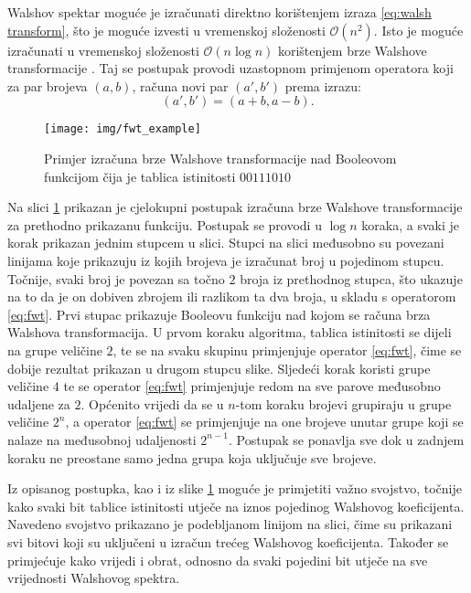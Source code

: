 Walshov spektar moguće je izračunati direktno korištenjem izraza \ref{eq:walsh transform}, što je moguće izvesti u vremenskoj složenosti $\mathcal{O}(n^2)$.
Isto je moguće izračunati u vremenskoj složenosti $\mathcal{O}(n\log n)$ korištenjem brze Walshove transformacije .
Taj se postupak provodi uzastopnom primjenom operatora koji za par brojeva $(a, b)$, računa novi par $(a', b')$ prema izrazu:
\begin{equation}\label{eq:fwt}
    (a', b') = (a+b, a-b).
\end{equation}
\begin{figure}[ht!] 
    \centering
    \texttt{[image: img/fwt\_example]}
    \captionsetup{justification=centering}
    \caption{Primjer izračuna brze Walshove transformacije nad Booleovom funkcijom čija je tablica istinitosti $00111010$}
    \label{fig:fwt_example}
\end{figure}
Na slici \ref{fig:fwt_example} prikazan je cjelokupni postupak izračuna brze Walshove transformacije za prethodno prikazanu funkciju.
Postupak se provodi u $\log n$ koraka, a svaki je korak prikazan jednim stupcem u slici.
Stupci na slici međusobno su povezani linijama koje prikazuju iz kojih brojeva je izračunat broj u pojedinom stupcu.
Točnije, svaki broj je povezan sa točno $2$ broja iz prethodnog stupca, što ukazuje na to da je on dobiven zbrojem ili razlikom ta dva broja, u skladu s operatorom \ref{eq:fwt}.
Prvi stupac prikazuje Booleovu funkciju nad kojom se računa brza Walshova transformacija.
U prvom koraku algoritma, tablica istinitosti se dijeli na grupe veličine $2$, te se na svaku skupinu primjenjuje operator \ref{eq:fwt}, čime se dobije rezultat prikazan u drugom stupcu slike.
Sljedeći korak koristi grupe veličine $4$ te se operator \ref{eq:fwt} primjenjuje redom na sve parove međusobno udaljene za $2$.
Općenito vrijedi da se u $n$-tom koraku brojevi grupiraju u grupe veličine $2^n$, a operator \ref{eq:fwt} se primjenjuje na one brojeve unutar grupe koji se nalaze na međusobnoj udaljenosti $2^{n-1}$.
Postupak se ponavlja sve dok u zadnjem koraku ne preostane samo jedna grupa koja uključuje sve brojeve.

Iz opisanog postupka, kao i iz slike \ref{fig:fwt_example} moguće je primjetiti važno svojstvo, točnije kako svaki bit tablice istinitosti utječe na iznos pojedinog Walshovog koeficijenta. 
Navedeno svojstvo prikazano je podebljanom linijom na slici, čime su prikazani svi bitovi koji su uključeni u izračun trećeg Walshovog koeficijenta.
Također se primjećuje kako vrijedi i obrat, odnosno da svaki pojedini bit utječe na sve vrijednosti Walshovog spektra.


